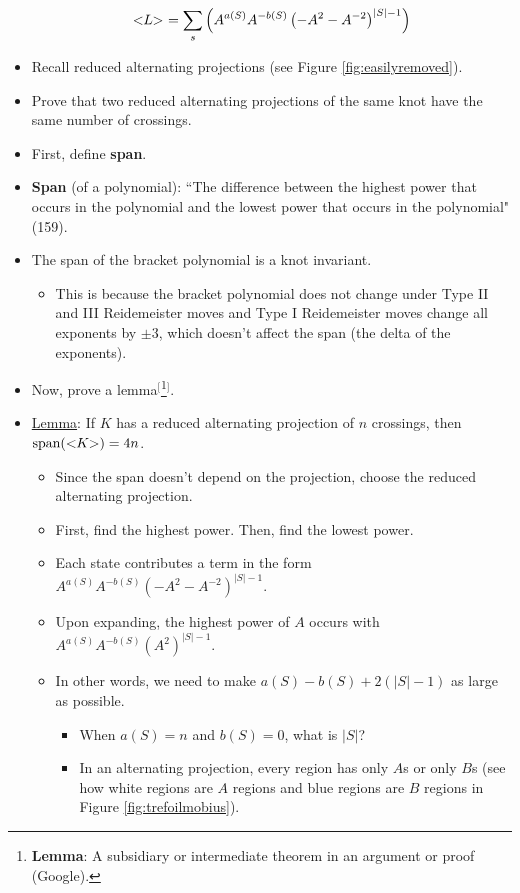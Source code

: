\documentclass[titlepage]{article}
\numberwithin{figure}{section}
\numberwithin{table}{section}
\numberwithin{equation}{section}
\newcommand{\dq}[2]{``#1" (#2).}
\newcommand{\lbq}{<\hspace{-3pt}}
\newcommand{\rbq}{\hspace{-3pt}>}
\begin{document}
\begin{itemize}
    \begin{equation}\label{eqn:sumnew}
        \lbq L\rbq\ =\sum_s \left( A^{a(S)}A^{-b(S)}\left(-A^2-A^{-2}\right)^{|S|-1} \right)
    \end{equation}
    \item Recall reduced alternating projections (see Figure \ref{fig:easilyremoved}).
    \item Prove that two reduced alternating projections of the same knot have the same number of crossings.
    \item First, define \textbf{span}.
    \item \textbf{Span} (of a polynomial): \dq{The difference between the highest power that occurs in the polynomial and the lowest power that occurs in the polynomial}{159}
    \item The span of the bracket polynomial is a knot invariant.
    \begin{itemize}
        \item This is because the bracket polynomial does not change under Type II and III Reidemeister moves and Type I Reidemeister moves change all exponents by $\pm 3$, which doesn't affect the span (the delta of the exponents).
    \end{itemize}
    \item Now, prove a lemma$^[$\footnote{\textbf{Lemma}: A subsidiary or intermediate theorem in an argument or proof (Google).}$^]$.
    \item \underline{Lemma}: If $K$ has a reduced alternating projection of $n$ crossings, then $\text{span}(\lbq K\rbq)=4n$.
    \begin{itemize}
        \item Since the span doesn't depend on the projection, choose the reduced alternating projection.
        \item First, find the highest power. Then, find the lowest power.
        \item Each state contributes a term in the form $A^{a(S)}A^{-b(S)}\left( -A^2-A^{-2} \right)^{|S|-1}$.
        \item Upon expanding, the highest power of $A$ occurs with $A^{a(S)}A^{-b(S)}\left( A^2 \right)^{|S|-1}$.
        \item In other words, we need to make $a(S)-b(S)+2(|S|-1)$ as large as possible.
        \begin{itemize}
            \item When $a(S)=n$ and $b(S)=0$, what is $|S|$?
            \item In an alternating projection, every region has only $A$s or only $B$s (see how white regions are $A$ regions and blue regions are $B$ regions in Figure \ref{fig:trefoilmobius}).

\end{itemize}
\end{itemize}
\end{itemize}
\end{document}
